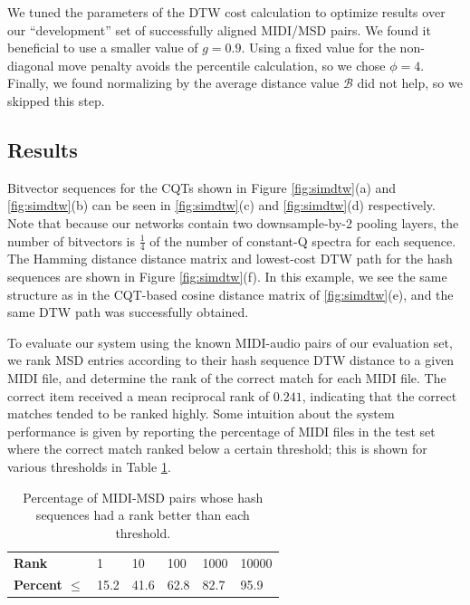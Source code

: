 \documentclass{article}
\begin{document}
We tuned the parameters of the DTW cost calculation to optimize results over our ``development'' set of successfully aligned MIDI/MSD pairs.
We found it beneficial to use a smaller value of $g = 0.9$.
Using a fixed value for the non-diagonal move penalty avoids the percentile calculation, so we chose $\phi = 4$.
Finally, we found normalizing by the average distance value $\mathcal{B}$ did not help, so we skipped this step.

\subsection{Results}

Bitvector sequences for the CQTs shown in Figure \ref{fig:simdtw}(a) and \ref{fig:simdtw}(b) can be seen in \ref{fig:simdtw}(c) and \ref{fig:simdtw}(d) respectively.
Note that because our networks contain two downsample-by-2 pooling layers, the number of bitvectors is $\frac{1}{4}$ of the number of constant-Q spectra for each sequence.
The Hamming distance distance matrix and lowest-cost DTW path for the hash sequences are shown in Figure \ref{fig:simdtw}(f). 
In this example, we see the same structure as in the CQT-based cosine distance matrix of  \ref{fig:simdtw}(e), and the same DTW path was successfully obtained.

To evaluate our system using the known MIDI-audio pairs of our evaluation set, we rank MSD entries according to their hash sequence DTW distance to a given MIDI file, and determine the rank of the correct match for each MIDI file.
The correct item received a mean reciprocal rank of \textbf{$0.241$}, indicating that the correct matches tended to be ranked highly.  
Some intuition about the system performance is given by reporting the percentage of MIDI files in the test set where the correct match ranked below a certain threshold; this is shown for various thresholds in Table \ref{tab:rank-percentages}.

\begin{table}
  \begin{center}
    \begin{tabular}{@{}llllll@{}}
      \toprule
      \textbf{Rank} & 1 & 10 & 100 & 1000 & 10000 \\
      \textbf{Percent $\le$} & 15.2 & 41.6 & 62.8 & 82.7 & 95.9 \\
      \bottomrule
    \end{tabular}
  \end{center}
  \caption{Percentage of MIDI-MSD pairs whose hash sequences had a rank better than each threshold.}
  \label{tab:rank-percentages}
\end{table}
\end{document}
